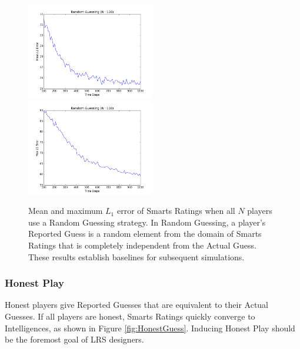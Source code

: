 \begin{figure}[h]
\centerline{%
\includegraphics[width=0.5\textwidth]{figures/robustness/Random_Guessing21.png}%
\includegraphics[width=0.5\textwidth] {figures/robustness/Random_Guessing22.png}%
}%
\caption{Mean and maximum $L_1$ error of Smarts Ratings when all $N$ players use a Random Guessing strategy. In Random Guessing, a player's Reported Guess is a random element from the domain of Smarts Ratings that is completely independent from the Actual Guess. These results establish baselines for subsequent simulations.}
\label{fig:RandomGuess}
\end{figure}

\subsubsection{Honest Play}

Honest players give Reported Guesses that are equivalent to their Actual Guesses. If all players are honest, Smarts Ratings quickly converge to Intelligences, as shown in Figure \ref{fig:HonestGuess}. Inducing Honest Play should be the foremost goal of LRS designers.

